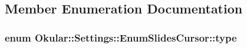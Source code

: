 \subsection{Member Enumeration Documentation}
\hypertarget{classOkular_1_1Settings_1_1EnumSlidesCursor_a1e2cb729c98ff2274a74500aa64abbc4}{
\subsubsection[{type}]{\setlength{\rightskip}{0pt plus 5cm}enum {\bf Okular\+::\+Settings\+::\+Enum\+Slides\+Cursor\+::type}}}\label{classOkular_1_1Settings_1_1EnumSlidesCursor_a1e2cb729c98ff2274a74500aa64abbc4}
